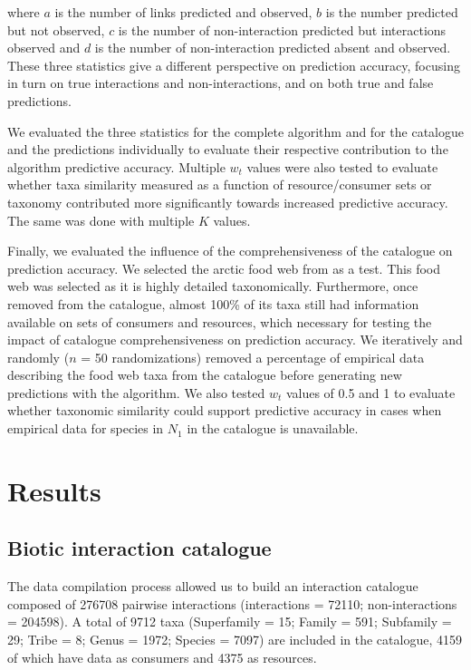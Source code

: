 \documentclass[letterpaper]{article}
\begin{document}
where $a$ is the number of links predicted and observed, $b$ is the number predicted but not observed, $c$ is the number of non-interaction predicted but interactions observed and $d$ is the number of non-interaction predicted absent and observed. These three statistics give a different perspective on prediction accuracy, focusing in turn on true interactions and non-interactions, and on both true and false predictions.

We evaluated the three statistics for the complete algorithm and for the catalogue and the predictions individually to evaluate their respective contribution to the algorithm predictive accuracy. Multiple $w_t$ values were also tested to evaluate whether taxa similarity measured as a function of resource/consumer sets or taxonomy contributed more significantly towards increased predictive accuracy. The same was done with multiple $K$ values.

Finally, we evaluated the influence of the comprehensiveness of the catalogue on prediction accuracy. We selected the arctic food web from \citet{Kortsch2015} as a test. This food web was selected as it is highly detailed taxonomically. Furthermore, once removed from the catalogue, almost 100\% of its taxa still had information available on sets of consumers and resources, which necessary for testing the impact of catalogue comprehensiveness on prediction accuracy. We iteratively and randomly ($n$ = 50 randomizations) removed a percentage of empirical data describing the food web taxa from the catalogue before generating new predictions with the algorithm. We also tested $w_t$ values of 0.5 and 1 to evaluate whether taxonomic similarity could support predictive accuracy in cases when empirical data for species in $N_1$ in the catalogue is unavailable.

\section{Results}
    \subsection{Biotic interaction catalogue}
The data compilation process allowed us to build an interaction catalogue composed of 276708 pairwise interactions (interactions = 72110; non-interactions = 204598). A total of 9712 taxa (Superfamily = 15; Family = 591; Subfamily = 29; Tribe = 8; Genus = 1972; Species = 7097) are included in the catalogue, 4159 of which have data as consumers and 4375 as resources.
\end{document}
